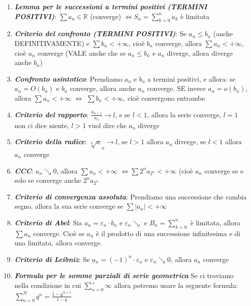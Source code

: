\documentclass{article}
\theoremstyle{definition}
\newcommand{\R}{\mathbb{R}}
\begin{document}
\begin{itemize}
\begin{enumerate}
        Abbiamo tre casi a seconda del valore di $\alpha$, dunque:
\begin{itemize}
    \item $\alpha > 1$, in questo caso la serie \textbf{converge} $\forall \beta$
    \item $\alpha =1$, allora converge se $\beta=1$, diverge se $\beta \leqslant 1$
    \item $\alpha < 1$, allora la serie \textbf{diverge} $\forall \,\,\,\,\, \beta$
\end{itemize}
        \item \textbf{\textit{Lemma per le successioni a termini positivi (TERMINI POSITIVI)}}: $\sum a_n \in \R$ (converge) $\Longleftrightarrow S_n = \sum_{k=0}^n a_k$ è limitata
        \item \textbf{\textit{Criterio del confronto (TERMINI POSITIVI)}}: Se $a_n \leqslant b_n$ (anche DEFINITIVAMENTE) e $\sum b_n < +\infty$, cioè $b_n$ converge, allora $\sum a_n < +\infty$, cioè $a_n$ converge (VALE anche che se $a_n \leqslant b_n$ e $a_n$ diverge, allora diverge anche $b_n$)
        \item \textbf{\textit{Confronto asintotico}}: Prendiamo $a_n$
        e $b_n$ a termini positivi, e allora: se $a_n= O(b_n)$ e $b_n$ converge, allora anche $a_n$ converge. SE invece $a_n=o(b_n)$, allora $\sum a_n < +\infty \,\, \Longleftrightarrow \,\, \sum b_n < +\infty$, cioè convergono entrambe
        \item \textbf{\textit{Criterio del rapporto}}: $\frac{a_{n+1}}{a_n} \to l$, e se $l < 1$, allora la serie converge, $l=1$ non ci dice niente, $l > 1$ vuol dire che $a_n$ diverge
        \item \textbf{\textit{Criterio della radice}}: $\sqrt[n]a_n \to l$, se $l>1$ allora $a_n$ diverge, se $l < 1$ allora $a_n$ converge
        \item \textbf{\textit{CCC}}: $a_n \searrow 0$, allora $\sum a_n < +\infty \,\, \Longleftrightarrow \sum 2^n a_{2^n} < +\infty$ (cioè $a_n$ converge se e solo se converge anche $2^na_{2^n}$
        \item \textbf{\textit{Criterio di convergenza assoluta}}: Prendiamo una successione che cambia segno, allora la sua serie converge se $\sum |a_n| < +\infty$
        \item \textbf{\textit{Criterio di Abel}}: Sia $a_n= \varepsilon_n \cdot b_n$ e $\varepsilon_n \searrow $ e $B_n = \sum_{k=0}^n$ è limitata, allora $\sum a_n$ converge. Cioè se $a_n$ è il prodotto di una successione infinitesima e di una limitata, allora converge.
        \item \textbf{\textit{Criterio di Leibniz}}: Se $a_n=(-1)^n \cdot \varepsilon_n$ e $\varepsilon_n \searrow 0$, allora $a_n$ converge
        \item \textbf{\textit{Formula per le somme parziali di serie geometrica}} Se ci troviamo nella condizione in cui $\sum_{n=0}^+\infty$ allora potremo usare la seguente formula: $\sum_{n=0}^N q^n= \frac{1-q^{N+1}}{1-q}$
        \end{enumerate}
        
\end{itemize}
\end{document}
